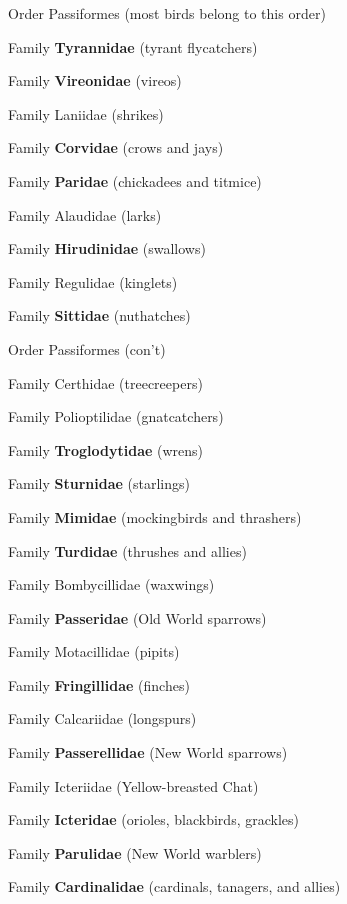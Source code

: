 \documentclass[10pt]{article}
\newlength\mylength
\newcommand*{\resetparindent}{\setlength{\parindent}{0pt}}
\newcommand*{\growparindent}{\addtolength{\parindent}{\mylength}}
\newcommand*{\reduceparindent}{\addtolength{\parindent}{-1\mylength}}
\begin{document}
\begin{multicols}{2}
\begin{spacing}{1.35}
	  \reduceparindent
	  
	  Order Passiformes (most birds belong to this order)
	  
	  \growparindent
	  
	  	Family \textbf{Tyrannidae} (tyrant flycatchers)
	  	
	  	Family \textbf{Vireonidae} (vireos)
	  	
	  	Family Laniidae (shrikes)
	  	
	  	Family \textbf{Corvidae} (crows and jays)
	  	
	  	Family \textbf{Paridae} (chickadees and titmice)
	  	
	  	Family Alaudidae (larks)
	  	
	  	Family \textbf{Hirudinidae} (swallows)
	  	
	  	Family Regulidae (kinglets)
	  	
	  	Family \textbf{Sittidae} (nuthatches)
	  	
	  \reduceparindent

		Order Passiformes (con't)

		\growparindent

	  	Family Certhidae (treecreepers)
	  	
	  	Family Polioptilidae (gnatcatchers)
	  	
	  	Family \textbf{Troglodytidae} (wrens)
	  	
	  	Family \textbf{Sturnidae} (starlings)
	  	
	  	Family \textbf{Mimidae} (mockingbirds and thrashers)
	  	
	  	Family \textbf{Turdidae} (thrushes and allies)
	  	
	  	Family Bombycillidae (waxwings)
	  	
	  	Family \textbf{Passeridae} (Old World sparrows)
	  	
	  	Family Motacillidae (pipits)
	  	
	  	Family \textbf{Fringillidae} (finches)
	  	
	  	Family Calcariidae (longspurs)
	  	
	  	Family \textbf{Passerellidae} (New World sparrows)
	  	
	  	Family Icteriidae (Yellow-breasted Chat)
	  	
	  	Family \textbf{Icteridae} (orioles, blackbirds, grackles)
	  	
	  	Family \textbf{Parulidae} (New World warblers)
	  	
	  	Family \textbf{Cardinalidae} (cardinals, tanagers, and allies)
	  	
     
\resetparindent
      
\end{spacing}

\end{multicols}
\end{document}
